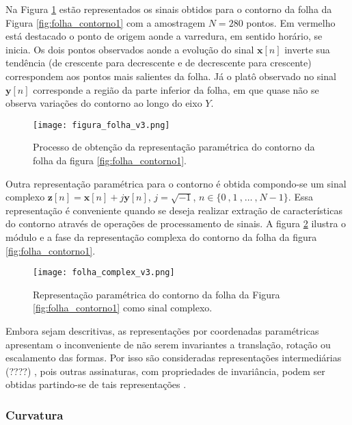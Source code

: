 Na Figura \ref{fig:folha_contorno} estão representados os sinais obtidos para o contorno da folha da Figura \ref{fig:folha_contorno1} com a amostragem $N = 280$ pontos. Em vermelho está destacado o ponto de origem aonde a varredura, em sentido horário, se inicia. Os dois pontos observados aonde a evolução do sinal $\mathbf{x}[n]$ inverte sua tendência (de crescente para decrescente e de decrescente para crescente) correspondem aos pontos mais salientes da folha. Já o platô observado no sinal $\mathbf{y}[n]$ corresponde a região da parte inferior da folha, em que quase não se observa variações do contorno ao longo do eixo $Y$.
   
\begin{figure} 
\caption{\label{fig:folha_contorno} Processo de obtenção da representação paramétrica do contorno da folha da figura \ref{fig:folha_contorno1}.}
\texttt{[image: figura\_folha\_v3.png]}
\end{figure}

Outra representação paramétrica para o contorno é obtida compondo-se um sinal complexo $\mathbf{z}[n] = \mathbf{x}[n] + j\mathbf{y}[n]$, $j = \sqrt{-1}$, $n \in {\{0\:\text{,}\:1\:\text{,}\:\dotsc\:\text{,}\:N-1\}}$. Essa representação é conveniente quando se deseja realizar extração de características do contorno através de operações de processamento de sinais. A figura \ref{fig:folha_complex} ilustra o módulo e a fase da representação complexa do contorno da folha da figura \ref{fig:folha_contorno1}. 

\begin{figure} 
\caption{\label{fig:folha_complex} Representação paramétrica do contorno da folha da Figura \ref{fig:folha_contorno1} como sinal complexo.}
\centering
\texttt{[image: folha\_complex\_v3.png]}
\end{figure} 

Embora sejam descritivas, as representações por coordenadas paramétricas apresentam o inconveniente de não serem invariantes a translação, rotação ou escalamento das formas. Por isso são consideradas \color{red} representações intermediárias (????) \color{black}, pois outras assinaturas, com propriedades de invariância, podem ser obtidas partindo-se de tais representações \cite{Kindratenko:2003}.

\subsubsection*{Curvatura\label{sec:curvatura}}

